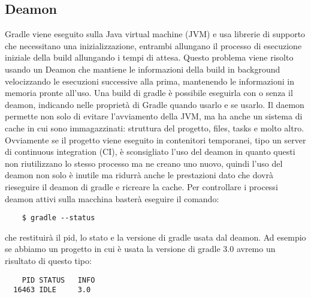 \subsection{Deamon}
Gradle viene eseguito sulla Java virtual machine (JVM) e usa librerie di supporto che necessitano una inizializzazione, entrambi allungano il processo di esecuzione iniziale della build allungando i tempi di attesa. Questo problema viene risolto usando un Deamon che mantiene le informazioni della build in background velocizzando le esecuzioni successive alla prima, mantenendo le informazioni in memoria pronte all'uso. Una build di gradle è possibile eseguirla con o senza il deamon, indicando nelle proprietà di Gradle quando usarlo e se usarlo. Il daemon permette non solo di evitare l'avviamento della JVM, ma ha anche un sistema di cache in cui sono immagazzinati: struttura del progetto, files, tasks e molto altro. Ovviamente se il progetto viene eseguito in contenitori temporanei, tipo un server di continuous integration (CI), è sconsigliato l'uso del deamon in quanto questi non riutilizzano lo stesso processo ma ne creano uno nuovo, quindi l'uso del deamon non solo è inutile ma ridurrà anche le prestazioni dato che dovrà rieseguire il deamon di gradle e ricreare la cache. Per controllare i processi deamon attivi sulla macchina basterà eseguire il comando:
\begin{verbatim}
    $ gradle --status \end{verbatim}
che restituirà il pid, lo stato e la versione di gradle usata dal deamon. Ad esempio se abbiamo un progetto in cui è usata la versione di gradle 3.0 avremo un risultato di questo tipo:
\begin{verbatim}
    PID STATUS   INFO
  16463 IDLE     3.0 \end{verbatim}
